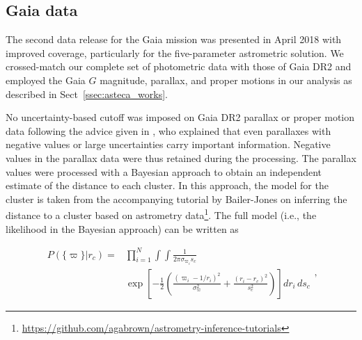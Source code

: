 \documentclass[draft]{aa}
\begin{document}
\subsection{Gaia data}
\label{ssec:gaia_data}

The second data release for the Gaia mission \citep{GaiaDR2_2018} was presented
in April 2018 with improved coverage, particularly for the five-parameter
astrometric solution.
We crossed-match our complete set of photometric data with those of Gaia DR2
and employed the Gaia $G$ magnitude, parallax, and proper motions in our
analysis as described in Sect~\ref{ssec:asteca_works}.

No uncertainty-based cutoff was imposed on Gaia DR2 parallax or proper
motion data following the advice given in \cite{Luri_2018}, who explained that even parallaxes with negative values or large
uncertainties carry important information. Negative values in the parallax
data were thus retained during the processing. The parallax values
were processed with a Bayesian approach to obtain an independent estimate of the
distance to each cluster. In this approach, the model for the cluster is
taken from the accompanying tutorial by Bailer-Jones on inferring the distance
to a cluster based on astrometry
data\footnote{
\url{https://github.com/agabrown/astrometry-inference-tutorials}}.
The full model (i.e., the likelihood in the Bayesian approach) can be
written as

\begin{equation}
\begin{aligned}
P\left(\{\varpi\} | r_{c}\right)
= & {} \prod_{i=1}^{N} \int \int \frac{1}{2 \pi \sigma_{\varpi_{i}} s_{c}} \\
& \exp \left[-\frac{1}{2} \left( \frac{\left(\varpi_{i}-1 / r_{i}\right)^{2}}{
\sigma_{\varpi}^{2}} + \frac{\left(r_{i}-r_{c}\right)^{2}}{s_{c}^
{2}}\right)\right]
d r_{i}\,d s_{c}
\label{eq:plx_lkl}
\end{aligned}
,\end{equation}
\end{document}
